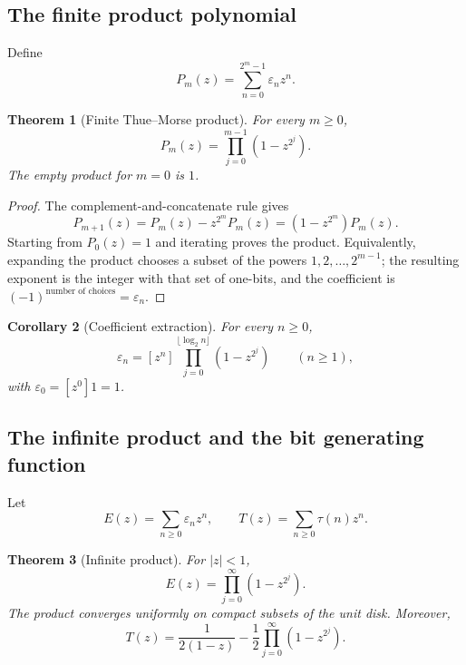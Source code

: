 \documentclass[11pt,oneside]{article}
\newtheorem{theorem}{Theorem}[section]
\newtheorem{corollary}[theorem]{Corollary}
\theoremstyle{definition}
\theoremstyle{remark}
\newcommand{\eps}{\varepsilon}
\newcommand{\1}{\mathbf 1}
\begin{document}
\subsection{The finite product polynomial}

Define
\begin{equation}
 P_m(z)=\sum_{n=0}^{2^m-1}\eps_nz^n.
 \label{eq:Pm-def}
\end{equation}

\begin{theorem}[Finite Thue--Morse product]
\label{thm:finite-product}
For every \(m\ge0\),
\begin{equation}
 \boxed{
 P_m(z)=\prod_{j=0}^{m-1}(1-z^{2^j}).}
 \label{eq:finite-product}
\end{equation}
The empty product for \(m=0\) is \(1\).
\end{theorem}

\begin{proof}
The complement-and-concatenate rule gives
\[
 P_{m+1}(z)
 =P_m(z)-z^{2^m}P_m(z)
 =(1-z^{2^m})P_m(z).
\]
Starting from \(P_0(z)=1\) and iterating proves the product.  Equivalently, expanding the
product chooses a subset of the powers \(1,2,\ldots,2^{m-1}\); the resulting exponent is the
integer with that set of one-bits, and the coefficient is \((-1)^{\text{number of choices}}
=\eps_n\).
\end{proof}

\begin{corollary}[Coefficient extraction]
\label{cor:coefficient}
For every \(n\ge0\),
\begin{equation}
 \boxed{
 \eps_n=[z^n]\prod_{j=0}^{\lfloor\log_2n\rfloor}(1-z^{2^j})}
 \qquad(n\ge1),
 \label{eq:coefficient-formula}
\end{equation}
with \(\eps_0=[z^0]1=1\).
\end{corollary}

\subsection{The infinite product and the bit generating function}

Let
\begin{equation}
 E(z)=\sum_{n\ge0}\eps_nz^n,
 \qquad
 T(z)=\sum_{n\ge0}\tau(n)z^n.
 \label{eq:E-T-def}
\end{equation}

\begin{theorem}[Infinite product]
\label{thm:infinite-product}
For \(|z|<1\),
\begin{equation}
 \boxed{
 E(z)=\prod_{j=0}^{\infty}(1-z^{2^j}).}
 \label{eq:infinite-product}
\end{equation}
The product converges uniformly on compact subsets of the unit disk.  Moreover,
\begin{equation}
 \boxed{
 T(z)=\frac{1}{2(1-z)}-\frac12\prod_{j=0}^{\infty}(1-z^{2^j}).}
 \label{eq:T-product}
\end{equation}
\end{theorem}
\end{document}
